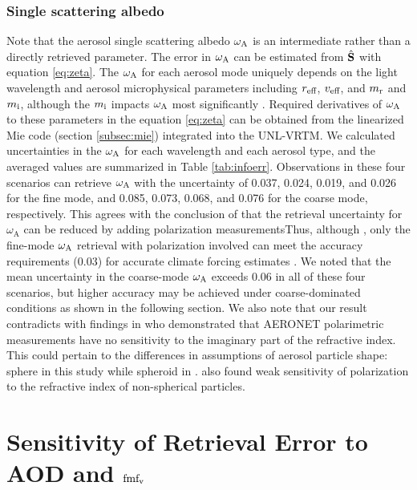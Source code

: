\subsubsection{Single scattering albedo}

Note that the aerosol single scattering albedo $\omega_\text{A}$ is an intermediate rather
than a directly retrieved parameter. The error in $\omega_\text{A}$ can be estimated
from $\hat{\mathbf{S}}$ with equation \eqref{eq:zeta}. The $\omega_\text{A}$ for each
aerosol mode uniquely depends on the light wavelength and aerosol 
microphysical parameters including $r_\text{eff}$, $v_\text{eff}$, and $m_\text{r}$ and $m_\text{i}$,
although the $m_\text{i}$ impacts $\omega_\text{A}$ most significantly \citep{Hansen74}.
Required derivatives of $\omega_\text{A}$ to these parameters in the equation
\eqref{eq:zeta} can be obtained from the linearized Mie code (section
\ref{subsec:mie}) integrated into the UNL-VRTM. We calculated uncertainties 
in the $\omega_\text{A}$ for each wavelength and each aerosol type, and the averaged 
values are summarized in Table \ref{tab:infoerr}. Observations in these four 
scenarios can  retrieve $\omega_\text{A}$ with the uncertainty of 0.037, 0.024, 0.019, 
and 0.026 for  the fine mode, and 0.085, 0.073, 0.068, and 0.076 for the coarse
mode, respectively. This agrees with the conclusion of
\citet{Hasekamp05a} that the retrieval uncertainty for $\omega_\text{A}$ 
can be reduced by adding polarization measurementsThus, although , 
only the fine-mode $\omega_\text{A}$ retrieval with polarization
involved can meet the accuracy requirements (0.03) for accurate climate forcing
estimates \citep{Mishchenko04}. We noted that the mean uncertainty in the
coarse-mode $\omega_\text{A}$ exceeds 0.06 in all of these four scenarios, but higher
accuracy may be achieved under coarse-dominated conditions as shown in the
following section. We also note that our result contradicts with findings
in \citet{Li09} who demonstrated that AERONET polarimetric
measurements have no sensitivity to the imaginary part of the refractive
index. This could pertain to the differences in assumptions of aerosol
particle shape: sphere in this study while spheroid in
\citet{Li09}. \citet{Dubovik06} also found weak sensitivity of
polarization to the refractive index of non-spherical particles.

\section{Sensitivity of Retrieval Error to AOD and $\text{fmf}_\text{v}$} 
\label{sec:infosensi}

